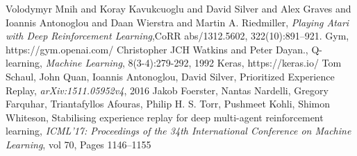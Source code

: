 \documentclass[conference]{IEEEtran}
\begin{document}
\begin{thebibliography}{00}
 Volodymyr Mnih and Koray Kavukcuoglu and David Silver and Alex Graves and Ioannis Antonoglou and Daan Wierstra and Martin A. Riedmiller, \textit{Playing Atari with Deep Reinforcement Learning},CoRR abs/1312.5602, 322(10):891–921.
 Gym, https://gym.openai.com/
 Christopher JCH Watkins and Peter Dayan., Q-learning, \textit{Machine Learning}, 8(3-4):279-292, 1992
 Keras, https://keras.io/
 Tom Schaul, John Quan, Ioannis Antonoglou, David Silver, Prioritized Experience Replay, \textit{arXiv:1511.05952v4}, 2016
 Jakob Foerster, Nantas Nardelli, Gregory Farquhar, Triantafyllos Afouras, Philip H. S. Torr, Pushmeet Kohli, Shimon Whiteson, Stabilising experience replay for deep multi-agent reinforcement learning, \textit{ICML'17: Proceedings of the 34th International Conference on Machine Learning}, vol 70, Pages 1146–1155
\end{thebibliography}
\vspace{12pt}
\end{document}
